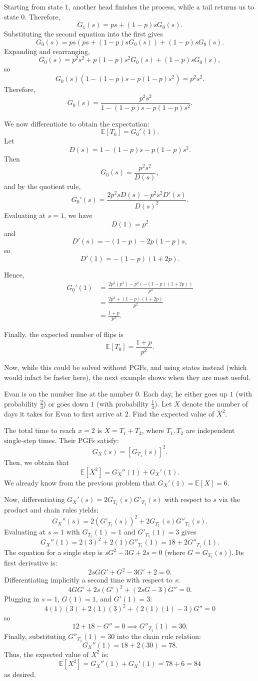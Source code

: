 \documentclass[11pt]{scrartcl}
\begin{document}
Starting from state $1$, another head finishes the process, while a tail returns us to state $0$. Therefore, \[G_1(s)=ps+(1-p)sG_0(s).\] Substituting the second equation into the first gives \[G_0(s) = ps\left(ps+(1-p)sG_0(s)\right) +(1-p)sG_0(s).\] Expanding and rearranging, \[G_0(s) = p^2s^2+p(1-p)s^2G_0(s)+(1-p)sG_0(s),\] so \[G_0(s)\left(1-(1-p)s-p(1-p)s^2\right)=p^2s^2.\] Therefore, \[G_0(s)= \frac{p^2s^2}{1-(1-p)s-p(1-p)s^2}.\]

We now differentiate to obtain the expectation: \[\mathbb{E}[T_0]=G_0'(1).\] Let \[D(s)=1-(1-p)s-p(1-p)s^2.\] Then \[G_0(s)=\frac{p^2s^2}{D(s)},\] and by the quotient rule, \[G_0'(s) =\frac{2p^2sD(s)-p^2s^2D'(s)}{D(s)^2}.\] Evaluating at $s=1$, we have \[D(1)=p^2\] and \[D'(s)=-(1-p)-2p(1-p)s,\] so \[D'(1)=-(1-p)(1+2p).\]

Hence,
\begin{align*}
G_0'(1) &= \frac{2p^2(p^2)-p^2\left(-(1-p)(1+2p)\right)}{p^4} \\
&= \frac{2p^2+(1-p)(1+2p)}{p^2} \\
&= \frac{1+p}{p^2}.
\end{align*}

Finally, the expected number of flips is \[ \boxed{\mathbb{E}[T_0]=\frac{1+p}{p^2}}.\]

Now, while this could be solved without PGFs, and using states instead (which would infact be faster here), the next example shows when they are most useful.

\begin{example*}[OTIS]
Evan is on the number line at the number $0$. Each day, he either goes up $1$ (with probability $\tfrac{2}{3}$) or goes down $1$ (with probability $\tfrac{1}{3}$). Let $X$ denote the number of days it takes for Evan to first arrive at $2$. Find the expected value of $X^2$.
\end{example*}

The total time to reach $x=2$ is $X = T_1 + T_2$, where $T_1, T_2$ are independent single-step times. Their PGFs satisfy: \[G_X(s) = [G_{T_1}(s)]^2.\] Then, we obtain that \[\mathbb{E}[X^2] = G_X''(1) + G_X'(1).\] We already know from the previous problem that $G_X'(1) = \mathbb{E}[X] = 6$.

Now, differentiating $G_X'(s) = 2G_{T_1}(s)G'_{T_1}(s)$ with respect to $s$ via the product and chain rules yields: \[G_X''(s) = 2 \left( G'_{T_1}(s) \right)^2 + 2G_{T_1}(s)G''_{T_1}(s).\] Evaluating at $s = 1$ with $G_{T_1}(1) = 1$ and $G'_{T_1}(1) = 3$ gives \[G_X''(1) = 2(3)^2 + 2(1)G''_{T_1}(1) = 18 + 2G''_{T_1}(1).\] The equation for a single step is $sG^2 - 3G + 2s = 0$ (where $G = G_{T_1}(s)$). Its first derivative is: \[2sGG' + G^2 - 3G' + 2 = 0.\] Differentiating implicitly a second time with respect to $s$: \[4GG' + 2s(G')^2 + (2sG - 3)G'' = 0.\] Plugging in $s = 1$, $G(1) = 1$, and $G'(1) = 3$: \[4(1)(3) + 2(1)(3)^2 + (2(1)(1) - 3)G'' = 0\] so \[12 + 18 - G'' = 0 \implies G''_{T_1}(1) = 30.\] Finally, substituting $G''_{T_1}(1) = 30$ into the chain rule relation: \[G_X''(1) = 18 + 2(30) = 78.\] Thus, the expected value of $X^2$ is: \[\mathbb{E}[X^2] = G_X''(1) + G_X'(1) = 78 + 6 = \boxed{84}\] as desired.
\end{document}
